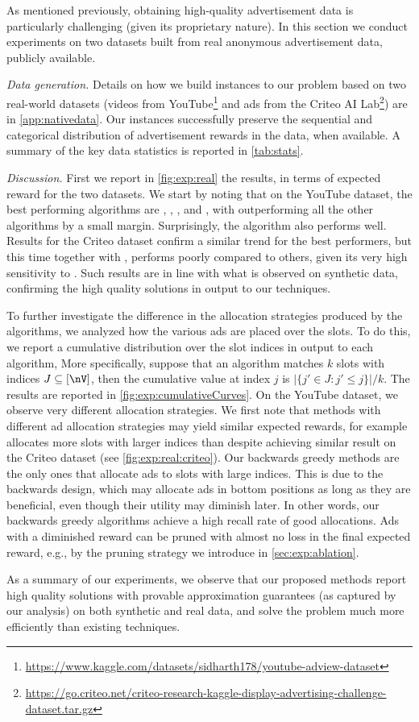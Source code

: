 As mentioned previously, obtaining high-quality advertisement data is particularly challenging (given its proprietary nature). %
In this section we conduct experiments on two datasets built from real anonymous advertisement data, publicly available.

\smallskip
\noindent
\emph{Data generation.} 
Details on how we build instances to our problem based on two real-world datasets  
(videos from YouTube\footnote{\url{https://www.kaggle.com/datasets/sidharth178/youtube-adview-dataset}} and ads from the Criteo AI Lab\footnote{\url{https://go.criteo.net/criteo-research-kaggle-display-advertising-challenge-dataset.tar.gz}}) are in \cref{app:nativedata}.
Our instances successfully preserve the sequential and categorical distribution of advertisement rewards in the data, when available.
A summary of the key data statistics is reported in \cref{tab:stats}.

\smallskip
\noindent
\emph{Discussion.} 
First we report in \cref{fig:exp:real} the results, in terms of expected reward for the two datasets. 
We start by noting that on the YouTube dataset, the best performing algorithms %
are \alggback, \alggbackproxy, \alggglobal, and \algflowg, with \alggglobal outperforming all the other algorithms by a small margin. 
Surprisingly, the \alggonline algorithm also performs well.
Results for the Criteo dataset confirm a similar trend for the best performers, but this time together with \alggforward,
\alggonline performs poorly compared to others, given its very high sensitivity to \Cthr.
Such results are in line with what is observed on synthetic data, confirming the high quality solutions in output to our techniques. 

To further investigate the difference in the allocation strategies  produced by the algorithms, 
we analyzed how the various ads are placed over the slots. 
To do this, we report a cumulative distribution over the slot indices in output to each algorithm,
More specifically, suppose that an algorithm matches $k$ slots 
with indices $J \subseteq [\nV]$, then the cumulative value at index $j$ is $|\{j' \in J : j' \le j\}|/k$. 
The results are reported in \cref{fig:exp:cumulativeCurves}.
On the YouTube dataset, we observe very different allocation strategies.
We first note that methods with different ad allocation strategies may yield similar expected rewards, for example \alggglobal allocates more slots with larger indices than \algmwm despite achieving similar result on the Criteo dataset (see \cref{fig:exp:real:criteo}).
Our backwards greedy methods are the only ones that allocate ads to slots with large indices.
This is due to the backwards design,
which may allocate ads in bottom positions as long as they are beneficial,
even though their utility may diminish later.
In other words, our backwards greedy algorithms achieve a high recall rate of good allocations.
Ads with a diminished reward can be pruned with almost no loss in the final expected reward, e.g., by the pruning strategy we introduce in \cref{sec:exp:ablation}.

As a summary of our experiments, we observe that our proposed methods report high quality solutions with provable approximation guarantees (as captured by our analysis) on both synthetic and real data, and solve the \streamads problem much more efficiently than existing techniques.

